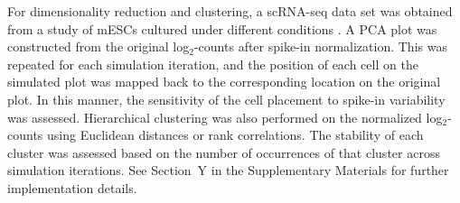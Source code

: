 \documentclass{article}
\begin{document}
For dimensionality reduction and clustering, a scRNA-seq data set was obtained from a study of mESCs cultured under different conditions \cite{kolod2015single}.
A PCA plot was constructed from the original log$_2$-counts after spike-in normalization.
This was repeated for each simulation iteration, and the position of each cell on the simulated plot was mapped back to the corresponding location on the original plot.
In this manner, the sensitivity of the cell placement to spike-in variability was assessed.
Hierarchical clustering was also performed on the normalized log$_2$-counts using Euclidean distances or rank correlations.
The stability of each cluster was assessed based on the number of occurrences of that cluster across simulation iterations.
See Section~Y in the Supplementary Materials for further implementation details.

{\small


}
\end{document}
